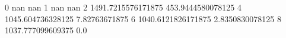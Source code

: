 0 nan nan
1 nan nan
2 1491.7215576171875 453.9444580078125
4 1045.604736328125 7.82763671875
6 1040.6121826171875 2.8350830078125
8 1037.777099609375 0.0
